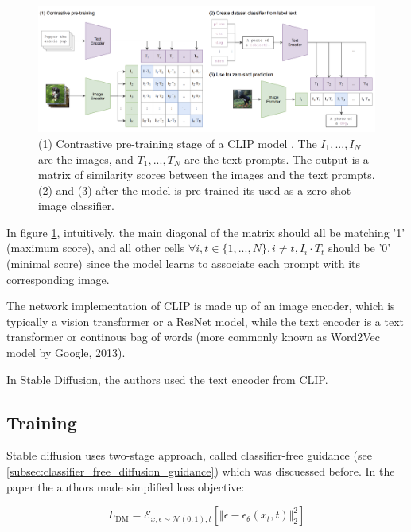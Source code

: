 \begin{figure}
    \centering
    \includegraphics[width=1\textwidth]{images/diffusion_models/stable_diffusion/clip.png}
    \caption{(1) Contrastive pre-training stage of a CLIP model \cite{openai_clip}. The $I_1, ..., I_N$ are the images, and $T_1, ..., T_N$ are the text prompts. The output is a matrix of similarity scores between the images and the text prompts. (2) and (3) after the model is pre-trained its used as a zero-shot image classifier.}
    \label{fig:openai_clip}
\end{figure}

In figure \ref{fig:openai_clip}, intuitively, the main diagonal of the matrix should all be matching '1' (maximum score), and all other cells $\forall i,t \in \{1, ..., N\}, i \neq t, I_i \cdot T_t$ should be '0' (minimal score) since the model learns to associate each prompt with its corresponding image.

The network implementation of CLIP is made up of an image encoder, which is typically a vision transformer \cite{vision_transformer} or a ResNet \cite{resnet} model, while the text encoder is a text transformer \cite{transformer} or continous bag of words \cite{cbow_word2vec} (more commonly known as Word2Vec model by Google, 2013).

In Stable Diffusion, the authors used the text encoder from CLIP. %












\subsection{Training}

Stable diffusion uses two-stage approach, called classifier-free guidance (see \ref{subsec:classifier_free_diffusion_guidance}) which was discuessed before. In the paper the authors made simplified loss objective:

\[
    L_{\text{DM}} = \mathcal{E}_{x, \epsilon \sim \mathcal{N} (0, 1), t} [ \Vert \epsilon - \epsilon_\theta(x_t, t) \Vert _2^2 ]
\]